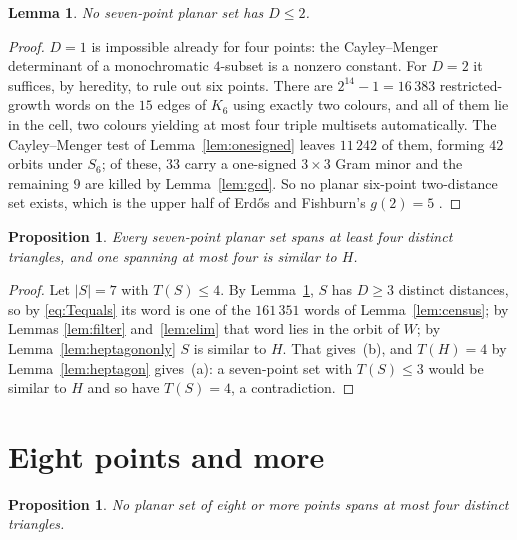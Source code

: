 \documentclass[11pt]{amsart}
\numberwithin{theorem}{section}
\newtheorem{lemma}[theorem]{Lemma}
\newtheorem{proposition}[theorem]{Proposition}
\theoremstyle{remark}
\theoremstyle{definition}
\newcommand{\Tcount}{T}
\begin{document}
\begin{lemma}\label{lem:small}
No seven-point planar set has $D\le2$.
\end{lemma}

\begin{proof}
$D=1$ is impossible already for four points: the Cayley--Menger determinant of a
monochromatic $4$-subset is a nonzero constant. For $D=2$ it suffices, by
heredity, to rule out six points. There are $2^{14}-1=16\,383$
restricted-growth words on the $15$ edges of $K_6$ using exactly two colours,
and all of them lie in the cell, two colours yielding at most four triple
multisets automatically. The Cayley--Menger test of Lemma~\ref{lem:onesigned}
leaves $11\,242$ of them, forming $42$ orbits under $S_6$; of these, $33$ carry
a one-signed $3\times3$ Gram minor and the remaining $9$ are killed by
Lemma~\ref{lem:gcd}. So no planar six-point two-distance set exists, which is
the upper half of Erd\H{o}s and Fishburn's $g(2)=5$ \cite{EF}.
\end{proof}

\begin{proposition}\label{prop:seven}
Every seven-point planar set spans at least four distinct triangles, and one
spanning at most four is similar to $H$.
\end{proposition}

\begin{proof}
Let $|S|=7$ with $\Tcount(S)\le4$. By Lemma~\ref{lem:small}, $S$ has $D\ge3$
distinct distances, so by \eqref{eq:Tequals} its word is one of the $161\,351$
words of Lemma~\ref{lem:census}; by Lemmas \ref{lem:filter} and~\ref{lem:elim}
that word lies in the orbit of $W$; by Lemma~\ref{lem:heptagononly} $S$ is
similar to $H$. That gives~(b), and $\Tcount(H)=4$ by
Lemma~\ref{lem:heptagon} gives~(a): a seven-point set with
$\Tcount(S)\le3$ would be similar to $H$ and so have $\Tcount(S)=4$, a
contradiction.
\end{proof}

\section{Eight points and more}\label{sec:eight}

\begin{proposition}\label{prop:eight}
No planar set of eight or more points spans at most four distinct triangles.
\end{proposition}
\end{document}
